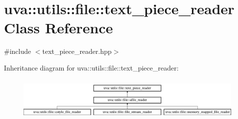 \hypertarget{classuva_1_1utils_1_1file_1_1text__piece__reader}{}\section{uva\+:\+:utils\+:\+:file\+:\+:text\+\_\+piece\+\_\+reader Class Reference}
\label{classuva_1_1utils_1_1file_1_1text__piece__reader}


{\ttfamily \#include $<$text\+\_\+piece\+\_\+reader.\+hpp$>$}

Inheritance diagram for uva\+:\+:utils\+:\+:file\+:\+:text\+\_\+piece\+\_\+reader\+:\begin{figure}[H]
\begin{center}
\leavevmode
\includegraphics[height=2.137405cm]{classuva_1_1utils_1_1file_1_1text__piece__reader}
\end{center}
\end{figure}
